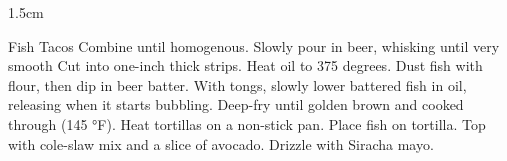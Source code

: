 \documentclass[]{article}
\title{}
\author{}
\begin{document}
\RecipeWidths{\textwidth}{3cm}{0.5cm}{3cm}{.75cm} {1.5cm}

\begin{recipe}{Fish Tacos}{}{}	
	Combine until homogenous.
	Slowly pour in beer, whisking until very smooth
	Cut into one-inch thick strips. 
	Heat oil to 375 degrees. 
	Dust fish with flour, then dip in beer batter. With tongs, slowly lower battered fish in oil, releasing when it starts bubbling. Deep-fry until golden brown and cooked through (145 °F). 
	Heat tortillas on a non-stick pan. 
	Place fish on tortilla. Top with cole-slaw mix and a slice of avocado. Drizzle with Siracha mayo. 
\end{recipe}
\end{document}
